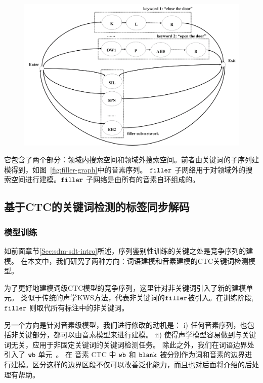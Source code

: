 \begin{figure}[!htp]
  \centering
    \captionstyle{\centering}
    \includegraphics[width=\textwidth]{figure/filler-graph.png}
\end{figure}


它包含了两个部分：领域内搜索空间和领域外搜索空间。前者由关键词的子序列建模得到，如图~\ref{fig:filler-graph}中的音素序列。 $\tt filler$ 子网络用于对领域外的搜索空间进行建模。$\tt filler$ 子网络是由所有的音素自环组成的。

\subsection{基于CTC的关键词检测的标签同步解码}
\label{Sec:kws-ctc}

\subsubsection{模型训练}
\label{Sec:modeltrain}

如前面章节\ref{Sec:sdm-sdt-intro}所述，序列鉴别性训练的关键之处是竞争序列的建模。
在本文中，我们研究了两种方向：词语建模和音素建模的CTC关键词检测模型。

为了更好地建模词级CTC模型的竞争序列，这里针对非关键词引入了新的建模单元。
类似于传统的声学KWS方法，代表非关键词的$\tt filler$被引入。在训练阶段, $\tt filler$ 则取代所有标注中的非关键词。

另一个方向是针对音素级模型，我们进行修改的动机是：
i) 任何音素序列，也包括非关键部分，都可以由音素模型来进行建模。
ii) 使得声学模型容易做到与关键词无关，应用于非固定关键词的关键词检测任务。
%
除此之外，我们在词语边界处引入了 $\tt wb$ 单元~\cite{zhuang-is2016}。 在 音素 CTC 中 $\tt wb$ 和 $\tt blank$ 被分别作为词和音素的边界进行建模。区分这样的边界区段不仅可以改善泛化能力，而且也对后面将介绍的后处理有帮助。

